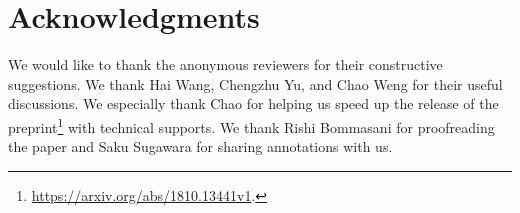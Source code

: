 \documentclass[11pt,a4paper]{article}
\begin{document}
% 







\section*{Acknowledgments}
We would like to thank the anonymous reviewers for their constructive suggestions. We thank Hai Wang, Chengzhu Yu, and Chao Weng for their useful discussions. We especially thank Chao for helping us speed up the release of the preprint\footnote{\url{https://arxiv.org/abs/1810.13441v1}.} with technical supports. We thank Rishi Bommasani for proofreading the paper and Saku Sugawara for sharing annotations with us.




\end{document}
